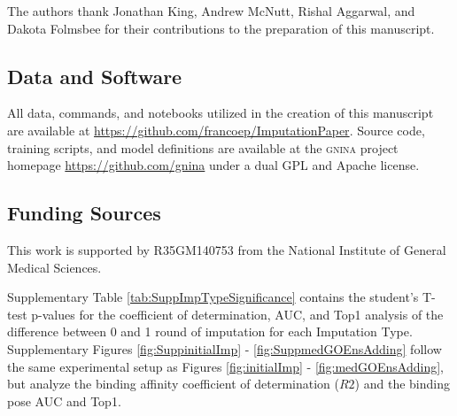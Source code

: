 \documentclass[journal=jcim,manuscript=article]{achemso}
\begin{document}
\begin{acknowledgement}

The authors thank Jonathan King, Andrew McNutt, Rishal Aggarwal, and Dakota Folmsbee for their contributions to the preparation of this manuscript.

\subsection{Data and Software}
All data, commands, and notebooks utilized in the creation of this manuscript are available at \url{https://github.com/francoep/ImputationPaper}.
Source code, training scripts, and model definitions are available at the \textsc{gnina} project homepage \url{https://github.com/gnina} under a dual GPL and Apache license.

\subsection{Funding Sources}
This work is supported by R35GM140753 from the National Institute of General Medical Sciences.

\end{acknowledgement}

\begin{suppinfo}

Supplementary Table \ref{tab:SuppImpTypeSignificance} contains the student's T-test p-values for the coefficient of determination, AUC, and Top1 analysis of the difference between 0 and 1 round of imputation for each Imputation Type.
Supplementary Figures \ref{fig:SuppinitialImp} - \ref{fig:SuppmedGOEnsAdding} follow the same experimental setup as Figures \ref{fig:initialImp} - \ref{fig:medGOEnsAdding}, but analyze the binding affinity coefficient of determination ($R2$) and the binding pose AUC and Top1.

\end{suppinfo}


\end{document}

